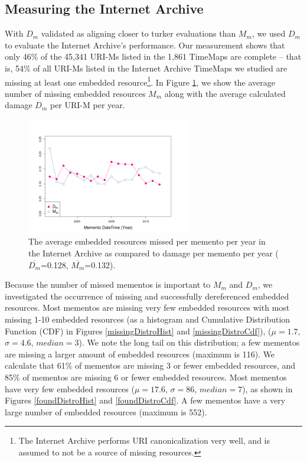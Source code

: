 \subsection{Measuring the Internet Archive}
\label{missing}

With $D_m$ validated as aligning closer to turker evaluations than $M_m$, we used $D_m$ to evaluate the Internet Archive's performance. Our measurement shows that only 46\% of the 45,341 URI-Ms listed in the 1,861 TimeMaps are complete -- that is, 54\% of all URI-Ms listed in the Internet Archive TimeMaps we studied are missing at least one embedded resource\footnote{The Internet Archive performs URI canonicalization very well, and is assumed to not be a source of missing resources.}. In Figure \ref{missingByYear}, we show the average number of missing embedded resources $M_m$ along with the average calculated damage $D_m$ per URI-M per year.


\begin{figure}[h!]
\includegraphics[width=270px]{./imgs/missedAndDamagePerYear.png}
\caption{The average embedded resources missed per memento per year in the Internet Archive as compared to damage per memento per year ($\overline{D_m}$=0.128, $\overline{M_m}$=0.132).}
\label{missingByYear}
\end{figure}


Because the number of missed mementos is important to $M_m$ and $D_m$, we investigated the occurrence of missing and successfully dereferenced embedded resources. Most mementos are missing very few embedded resources with most missing 1-10 embedded resources (as a histogram and Cumulative Distribution Function (CDF) in Figures \ref{missingDistroHist} and \ref{missingDistroCdf}), ($\mu=1.7$, $\sigma=4.6$, $median=3$). We note the long tail on this distribution; a few mementos are missing a larger amount of embedded resources (maximum is 116). We calculate that 61\% of mementos are missing 3 or fewer embedded resources, and 85\% of mementos are missing 6 or fewer embedded resources. Most mementos have very few embedded resources ($\mu=17.6$, $\sigma=86$, $median=7$), as shown in Figures \ref{foundDistroHist} and \ref{foundDistroCdf}. A few mementos have a very large number of embedded resources (maximum is 552).

